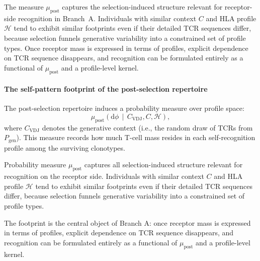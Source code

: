 \documentclass[11pt]{article}
\begin{document}
The measure \(\mu_{\mathrm{post}}\) captures the selection-induced structure relevant for receptor-side recognition in Branch~A. Individuals with similar context \(C\) and HLA profile \(\mathcal{H}\) tend to exhibit similar footprints even if their detailed TCR sequences differ, because selection funnels generative variability into a constrained set of profile types. Once receptor mass is expressed in terms of profiles, explicit dependence on TCR sequence disappears, and recognition can be formulated entirely as a functional of \(\mu_{\mathrm{post}}\) and a profile-level kernel.


\paragraph{The self-pattern footprint of the post-selection repertoire}


The post-selection repertoire induces a probability measure over profile space:
\[
    \mu_{\mathrm{post}}\!\left(\mathrm{d}\phi \,\middle|\, C_{\mathrm{VDJ}}, C, \mathcal{H}\right),
\]
where \(C_{\mathrm{VDJ}}\) denotes the generative context (i.e., the random draw of TCRs from \(P_{\mathrm{gen}}\)). This measure records how much T-cell mass resides in each self-recognition profile among the surviving clonotypes.

Probability measure \(\mu_{\mathrm{post}}\) captures all selection-induced structure relevant for recognition on the receptor side. Individuals with similar context \(C\) and HLA profile \(\mathcal{H}\) tend to exhibit similar footprints even if their detailed TCR sequences differ, because selection funnels generative variability into a constrained set of profile types.

The footprint is the central object of Branch A: once receptor mass is expressed in terms of profiles, explicit dependence on TCR sequence disappears, and recognition can be formulated entirely as a functional of \(\mu_{\mathrm{post}}\) and a profile-level kernel.

\end{document}
